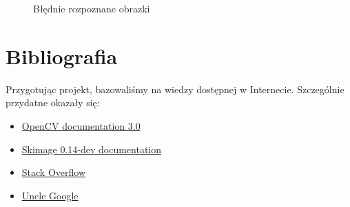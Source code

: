 \documentclass{mwart}
\begin{document}
\begin{figure}[ht!]
\begin{center}
{        }
    \end{center}
    \caption{Błędnie rozpoznane obrazki}
   \label{fig:subfigures}
\end{figure}
\section{Bibliografia}

Przygotując projekt, bazowaliśmy na wiedzy dostępnej w Internecie. Szczególnie przydatne okazały się:

\begin{itemize}
    \item \href{https://docs.opencv.org/3.0-beta/index.html}{OpenCV documentation 3.0}
    \item \href{http://scikit-image.org/docs/dev/}{Skimage 0.14-dev documentation}
    \item \href{https://stackoverflow.com/}{Stack Overflow}
    \item \href{https://google.com/}{Uncle Google}
\end{itemize}
\end{document}

